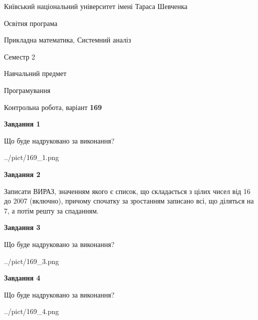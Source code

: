 \documentclass[12pt, ukrainian]{article}
\begin{document}
{{\begin {small}\par
{ \center  Київський національний університет імені Тараса Шевченка \par}
{\parbox {5 cm}{Освітня програма \hfill}{\parbox {8 cm}{Прикладна математика, Системний аналіз \hfill}}\parbox {5 cm}{\hfill Семестр 2}}\par
{\parbox {5 cm} {Навчальний предмет \hfill}\parbox {7 cm}{Програмування \hfill}\parbox {6cm}{\hfill}\par}\vspace{-7pt} \end{small}}{\center Контрольна робота, варіант  \No \textbf
{ 169 }\par}}
{
\begin {large}
{\begin {center}\textbf{Завдання 1}\end {center}}\par
Що буде надруковано за виконання?\par\par
\begin{center}
	{../pict/169_1.png}
\end{center}
\newpage

{\begin {center}\textbf{Завдання 2}\end {center}}\par

Записати ВИРАЗ, значенням якого є список, що складається з цілих чисел від 16 до 2007 (включно), причому спочатку за зростанням записано всі, що діляться на 7, а потім решту за спаданням.\par
\newpage

{\begin {center}\textbf{Завдання 3}\end {center}}\par
Що буде надруковано за виконання?\par
\begin{center}
	{../pict/169_3.png}
\end{center}
\newpage

{\begin {center}\textbf{Завдання 4}\end {center}}\par
Що буде надруковано за виконання?\par
\begin{center}
	{../pict/169_4.png}
\end{center}
\newpage


\end{large}}
\end{document}
